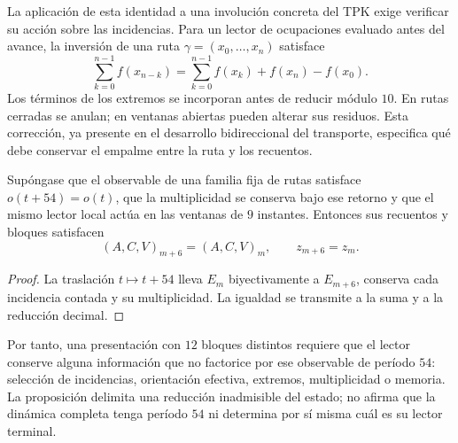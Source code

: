 La aplicación de esta identidad a una involución concreta del TPK exige
verificar su acción sobre las incidencias. Para un lector de ocupaciones
evaluado antes del avance, la inversión de una ruta
\(\gamma=(x_0,\ldots,x_n)\) satisface
\[
 \sum_{k=0}^{n-1}f(x_{n-k})
 =\sum_{k=0}^{n-1}f(x_k)+f(x_n)-f(x_0).
\]
Los términos de los extremos se incorporan antes de reducir módulo
\(10\). En rutas cerradas se anulan; en ventanas abiertas pueden
alterar sus residuos. Esta corrección, ya presente en el desarrollo
bidireccional del transporte, especifica qué debe conservar el empalme
entre la ruta y los recuentos.

\begin{proposition}
Supóngase que el observable de una familia fija de rutas satisface
\(o(t+54)=o(t)\), que la multiplicidad se conserva bajo ese retorno
y que el mismo lector local actúa en las ventanas de \(9\) instantes.
Entonces sus recuentos y bloques satisfacen
\[
 (A,C,V)_{m+6}=(A,C,V)_m,\qquad z_{m+6}=z_m.
\]
\end{proposition}

\begin{proof}
La traslación \(t\mapsto t+54\) lleva \(E_m\) biyectivamente
a \(E_{m+6}\), conserva cada incidencia contada y su multiplicidad.
La igualdad se transmite a la suma y a la reducción decimal.
\end{proof}

Por tanto, una presentación con \(12\) bloques distintos requiere que
el lector conserve alguna información que no factorice por ese observable
de período \(54\): selección de incidencias, orientación efectiva,
extremos, multiplicidad o memoria. La proposición delimita una reducción
inadmisible del estado; no afirma que la dinámica completa tenga
período \(54\) ni determina por sí misma cuál es su lector terminal.
